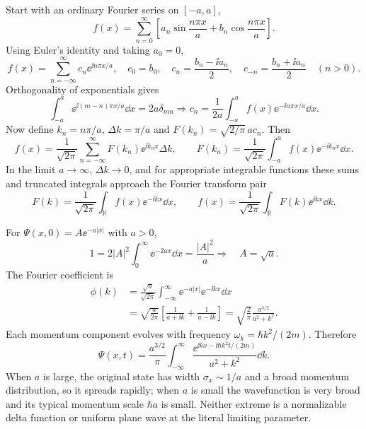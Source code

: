 Start with an ordinary Fourier series on $[-a,a]$,
\begin{equation}
f(x)=\sum_{n=0}^{\infty}
\left[a_n\sin\frac{n\pi x}{a}+b_n\cos\frac{n\pi x}{a}\right].
\end{equation}
Using Euler's identity and taking $a_0=0$,
\begin{equation}
f(x)=\sum_{n=-\infty}^\infty c_n\ee^{\ii n\pi x/a},
\quad c_0=b_0,\quad
c_n=\frac{b_n-\ii a_n}{2},\quad
c_{-n}=\frac{b_n+\ii a_n}{2}\quad(n>0).
\end{equation}
Orthogonality of exponentials gives
\begin{equation}
\int_{-a}^{a}\ee^{\ii(m-n)\pi x/a}\dd x
=2a\delta_{mn}
\Rightarrow
\boxed{c_n=\frac1{2a}\int_{-a}^{a}
f(x)\ee^{-\ii n\pi x/a}\dd x}.
\end{equation}
Now define $k_n=n\pi/a$, $\Delta k=\pi/a$ and
$F(k_n)=\sqrt{2/\pi}\,a c_n$.
Then
\begin{equation}
f(x)=\frac1{\sqrt{2\pi}}\sum_{n=-\infty}^\infty
F(k_n)\ee^{\ii k_nx}\Delta k,\qquad
F(k_n)=\frac1{\sqrt{2\pi}}\int_{-a}^a
f(x)\ee^{-\ii k_nx}\dd x.
\end{equation}
In the limit $a\to\infty$, $\Delta k\to0$,
and for appropriate integrable functions these sums
and truncated integrals approach the Fourier transform pair
\begin{equation}
\boxed{F(k)=\frac1{\sqrt{2\pi}}\int_{\mathbb R}
f(x)\ee^{-\ii kx}\dd x,\qquad
f(x)=\frac1{\sqrt{2\pi}}\int_{\mathbb R}
F(k)\ee^{\ii kx}\dd k}.
\end{equation}

For $\Psi(x,0)=A\ee^{-a|x|}$ with $a>0$,
\begin{equation}
1=2|A|^2\int_0^\infty\ee^{-2ax}\dd x
=\frac{|A|^2}{a}
\Rightarrow\quad \boxed{A=\sqrt a}.
\end{equation}
The Fourier coefficient is
\begin{align}
\phi(k)&=\frac{\sqrt a}{\sqrt{2\pi}}
\int_{-\infty}^\infty\ee^{-a|x|}
\ee^{-\ii kx}\dd x\\
&=\sqrt{\frac a{2\pi}}
\left[\frac1{a+\ii k}+\frac1{a-\ii k}\right]
=\boxed{\sqrt{\frac2\pi}\frac{a^{3/2}}{a^2+k^2}}.
\end{align}
Each momentum component evolves with frequency
$\omega_k=\hbar k^2/(2m)$. Therefore
\begin{equation}
\boxed{
\Psi(x,t)=\frac{a^{3/2}}{\pi}
\int_{-\infty}^\infty
\frac{\ee^{\ii kx-\ii\hbar k^2t/(2m)}}{a^2+k^2}\dd k}.
\end{equation}
When $a$ is large, the original state has width
$\sigma_x\sim1/a$ and a broad momentum distribution,
so it spreads rapidly; when $a$ is small the
wavefunction is very broad and its typical momentum
scale $\hbar a$ is small.
Neither extreme is a normalizable delta function
or uniform plane wave at the literal limiting parameter.

